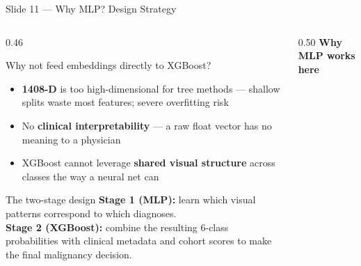 \documentclass[aspectratio=169, 9pt]{beamer}
\begin{document}
\begin{frame}{Slide 11 --- Why MLP? Design Strategy}

  \begin{columns}[T]

    \begin{column}{0.46\textwidth}
      \begin{alertblock}{Why not feed embeddings directly to XGBoost?}
        \small
        \begin{itemize}[leftmargin=1em, itemsep=0pt]
          \item \textbf{1408-D} is too high-dimensional for tree methods ---
                shallow splits waste most features; severe overfitting risk
          \item No \textbf{clinical interpretability} --- a raw float vector
                has no meaning to a physician
          \item XGBoost cannot leverage \textbf{shared visual structure}
                across classes the way a neural net can
        \end{itemize}
      \end{alertblock}

      \vspace{0.4em}
      \begin{block}{The two-stage design}
        \small
        \textbf{Stage 1 (MLP):} learn which visual patterns correspond
        to which diagnoses.\\[0.3em]
        \textbf{Stage 2 (XGBoost):} combine the resulting 6-class
        probabilities with clinical metadata and cohort scores
        to make the final malignancy decision.
      \end{block}
    \end{column}

    \begin{column}{0.50\textwidth}
      \textbf{\color{navyblue}Why MLP works here}


\end{column}
\end{columns}
\end{frame}
\end{document}

